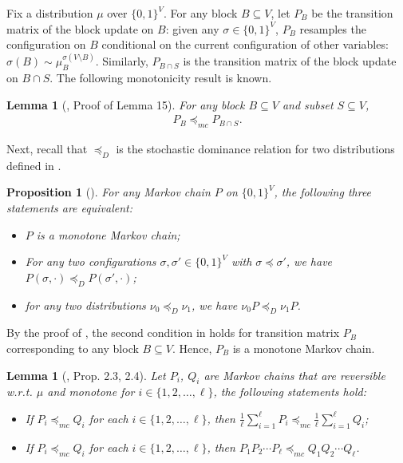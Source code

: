 \documentclass[11pt]{amsart}
\newtheorem{lemma}[theorem]{Lemma}
\newtheorem{proposition}[theorem]{Proposition}
\theoremstyle{definition}
\theoremstyle{remark}
\begin{document}
Fix a distribution $\mu$ over $\{0,1\}^V$.
For any block $B \subseteq V$, let $P_B$ be the transition matrix of the block update on $B$: given any $\sigma \in \{0,1\}^V$, $P_B$ resamples the configuration on $B$ conditional on the current configuration of other variables: $\sigma(B) \sim \mu_{B}^{\sigma(V \setminus B)}$. Similarly, $P_{B \cap S}$ is the transition matrix of the block update on $B\cap S$. The following monotonicity result is known.
\begin{lemma}[, Proof of Lemma 15]\label{lemma:monotone-each-block}
For any block $B\subseteq V$ and subset $S\subseteq V$, %
\begin{align*}
    P_{B}\preceq_{mc} P_{B\cap S}.
\end{align*}
\end{lemma}

Next, recall that $\preceq_D$ is the stochastic dominance relation for two distributions defined in .
\begin{proposition}[]\label{prop:monotone-equiv-definition}
For any Markov chain $P$ on $\{0,1\}^V$, the following three statements are equivalent:
\begin{itemize}
    \item $P$ is a monotone Markov chain;
    \item For any two configurations $\sigma,\sigma'\in \{0,1\}^V$ with $\sigma\preceq \sigma'$, we have $P(\sigma,\cdot)\preceq_D P(\sigma',\cdot)$;
    \item for any two distributions $\nu_0\preceq_D \nu_1$, we have $\nu_0P\preceq_D \nu_1P$.
\end{itemize}
\end{proposition}

By the proof of , the second condition in  holds for transition matrix $P_B$ corresponding to any block $B\subseteq V$. Hence, $P_B$ is a monotone Markov chain. 

\begin{lemma}[, Prop. 2.3, 2.4]\label{lemma:monotone-mc-property}
Let $P_i$, $Q_i$ are Markov chains that are reversible w.r.t. $\mu$ and monotone for $i\in \{1,2,\ldots,\ell\}$, the following statements hold:
\begin{itemize}
    \item If $P_i\preceq_{mc} Q_i$ for each $i\in \{1,2,\ldots,\ell\}$, then $\frac{1}{\ell}\sum_{i=1}^\ell P_i \preceq_{mc} \frac{1}{\ell}\sum_{i=1}^\ell Q_i$; 
    \item If $P_i\preceq_{mc} Q_i$ for each $i\in \{1,2,\ldots,\ell\}$, then $P_1P_2\cdots P_\ell \preceq_{mc} Q_1Q_2\cdots Q_\ell$.
\end{itemize}
\end{lemma}
\end{document}
